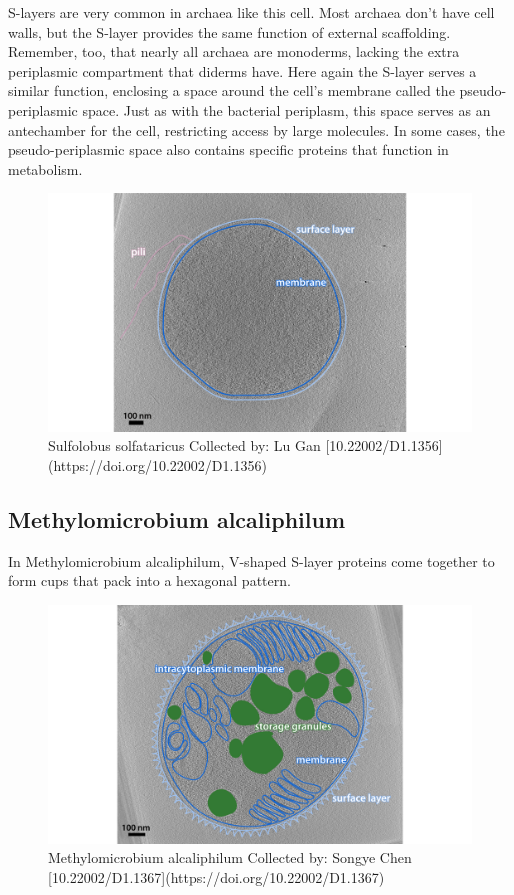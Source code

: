 \documentclass[]{tufte-book}
\begin{document}
S-layers are very common in archaea like this cell. Most archaea don't
have cell walls, but the S-layer provides the same function of external
scaffolding. Remember, too, that nearly all archaea are monoderms,
lacking the extra periplasmic compartment that diderms have. Here again
the S-layer serves a similar function, enclosing a space around the
cell's membrane called the pseudo-periplasmic space. Just as with the
bacterial periplasm, this space serves as an antechamber for the cell,
restricting access by large molecules. In some cases, the
pseudo-periplasmic space also contains specific proteins that function
in metabolism.

\begin{figure}
\includegraphics{img/2_7_Ssolfataricus} \caption[Sulfolobus solfataricus Collected by]{Sulfolobus solfataricus Collected by: Lu Gan [10.22002/D1.1356](https://doi.org/10.22002/D1.1356)}\label{fig:unnamed-chunk-20}
\end{figure}

\hypertarget{M._alcaliphilum}{\subsection{Methylomicrobium
alcaliphilum}\label{M._alcaliphilum}}

In Methylomicrobium alcaliphilum, V-shaped S-layer proteins come
together to form cups that pack into a hexagonal pattern.

\begin{figure}
\includegraphics{img/2_7a_Malcaliphilum} \caption[Methylomicrobium alcaliphilum Collected by]{Methylomicrobium alcaliphilum Collected by: Songye Chen [10.22002/D1.1367](https://doi.org/10.22002/D1.1367)}\label{fig:unnamed-chunk-21}
\end{figure}
\end{document}

